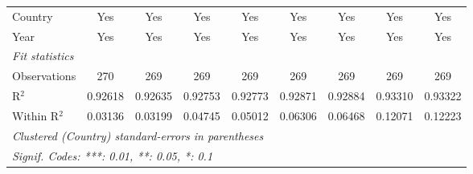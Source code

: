 \begin{table}[htbp]
\begin{tabular}{lcccccccc}
      Country                                   & Yes             & Yes                   & Yes            & Yes            & Yes             & Yes             & Yes             & Yes\\  
      Year                                      & Yes             & Yes                   & Yes            & Yes            & Yes             & Yes             & Yes             & Yes\\  
      \midrule
      \emph{Fit statistics}\\
      Observations                              & 270             & 269                   & 269            & 269            & 269             & 269             & 269             & 269\\  
      R$^2$                                     & 0.92618         & 0.92635               & 0.92753        & 0.92773        & 0.92871         & 0.92884         & 0.93310         & 0.93322\\  
      Within R$^2$                              & 0.03136         & 0.03199               & 0.04745        & 0.05012        & 0.06306         & 0.06468         & 0.12071         & 0.12223\\  
      \midrule \midrule
      \multicolumn{9}{l}{\emph{Clustered (Country) standard-errors in parentheses}}\\
      \multicolumn{9}{l}{\emph{Signif. Codes: ***: 0.01, **: 0.05, *: 0.1}}\\
   \end{tabular}
\end{table}


